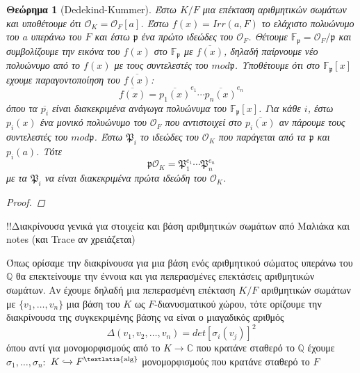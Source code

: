 \documentclass[oneside,a4paper]{article}
\newtheorem{theorem}{Θεώρημα}
\newcommand {\tl}{\textlatin}
\newcommand{\Q}{\mathbb{Q}}
\begin{document}
\begin{theorem}[\tl{Dedekind-Kummer}]
	Έστω $K/F$ μια επέκταση αριθμητικών σωμάτων και υποθέτουμε ότι $\mathcal{O}_K = \mathcal{O}_F [a]$. Έστω $f(x) = Irr(a,F)$ το ελάχιστο πολυώνυμο του $a$ υπεράνω του $F$ και έστω $\mathfrak{p}$ ένα πρώτο ιδεώδες του $\mathcal{O}_F$. Θέτουμε $\mathbb{F}_{\mathfrak{p}} = \mathcal{O}_F / \mathfrak{p}$ και συμβολίζουμε την εικόνα του $f(x)$ στο $\mathbb{F}_{\mathfrak{p}}$ με $\overline{f(x)}$, δηλαδή παίρνουμε νέο πολυώνυμο από το $f(x)$ με τους συντελεστές του $mod\mathfrak{p}$. Υποθέτουμε ότι στο $\mathbb{F}_{\mathfrak{p}}[x]$ εχουμε παραγοντοποίηση του $\overline{f(x)}$:
	$$\overline{f(x)} = \overline{p_1(x)}^{e_1} \cdots \overline{p_n(x)}^{e_n}$$ όπου τα $\overline{p_i}$ είναι διακεκριμένα ανάγωγα πολυώνυμα του $\mathbb{F}_{\mathfrak{p}}[x]$. Για κάθε $i$, έστω $p_i(x)$ ένα μονικό πολυώνυμο του $\mathcal{O}_F$ που αντιστοιχεί στο $\overline{p_i(x)}$ αν πάρουμε τους συντελεστές του $mod\mathfrak{p}$. Έστω $\mathfrak{P}_i$ το ιδεώδες του $\mathcal{O}_K$ που παράγεται από τα $\mathfrak{p}$ και $p_i(a)$. Τότε $$\mathfrak{p} \mathcal{O}_K = \mathfrak{P}^{e_1}_1 \cdots \mathfrak{P}^{e_n}_n$$ με τα $\mathfrak{P}_i$ να είναι διακεκριμένα πρώτα ιδεώδη του $\mathcal{O}_K$.

	\begin{proof}
	\end{proof}
\end{theorem}

!!Διακρίνουσα γενικά για στοιχεία και βάση αριθμητικών σωμάτων από Μαλιάκα και \tl{notes} (και \tl{Trace} αν χρειάζεται)


Όπως ορίσαμε την διακρίνουσα για μια βάση ενός αριθμητικού σώματος υπεράνω του $\Q$ θα επεκτείνουμε την έννοια και για πεπερασμένες επεκτάσεις αριθμητικών σωμάτων. Αν έχουμε δηλαδή μια πεπερασμένη επέκταση $K/F$ αριθμητικών σωμάτων με $\{v_1,\ldots,v_n\}$ μια βάση του $K$ ως $F$-διανυσματικού χώρου, τότε ορίζουμε την διακρίνουσα της συγκεκριμένης βάσης να είναι ο μιαγαδικός αριθμός 
$$\Delta(v_1,v_2,\ldots,v_n) = det[\sigma_i (v_j)]^2$$ όπου αντί για μονομορφισμούς από το $K\rightarrow \mathbb{C}$ που κρατάνε σταθερό το $\Q$ έχουμε $\sigma_1,\ldots , \sigma_n:$ $ K \xhookrightarrow{} F^{\text{\tl{alg}}}$ μονομορφισμούς που κρατάνε σταθερό το $F$
\end{document}
